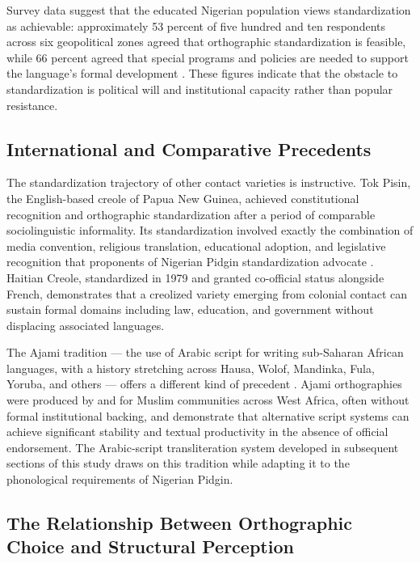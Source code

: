 \documentclass[12pt]{article}
\begin{document}
Survey data suggest that the educated Nigerian population views standardization as achievable: approximately 53 percent of five hundred and ten respondents across six geopolitical zones agreed that orthographic standardization is feasible, while 66 percent agreed that special programs and policies are needed to support the language's formal development \cite{AjaKilani2024}. These figures indicate that the obstacle to standardization is political will and institutional capacity rather than popular resistance.

\subsection{International and Comparative Precedents}

The standardization trajectory of other contact varieties is instructive. Tok Pisin, the English-based creole of Papua New Guinea, achieved constitutional recognition and orthographic standardization after a period of comparable sociolinguistic informality. Its standardization involved exactly the combination of media convention, religious translation, educational adoption, and legislative recognition that proponents of Nigerian Pidgin standardization advocate \cite{Holm1988}. Haitian Creole, standardized in 1979 and granted co-official status alongside French, demonstrates that a creolized variety emerging from colonial contact can sustain formal domains including law, education, and government without displacing associated languages.

The Ajami tradition --- the use of Arabic script for writing sub-Saharan African languages, with a history stretching across Hausa, Wolof, Mandinka, Fula, Yoruba, and others --- offers a different kind of precedent \cite{Ngom2010}. Ajami orthographies were produced by and for Muslim communities across West Africa, often without formal institutional backing, and demonstrate that alternative script systems can achieve significant stability and textual productivity in the absence of official endorsement. The Arabic-script transliteration system developed in subsequent sections of this study draws on this tradition while adapting it to the phonological requirements of Nigerian Pidgin.

\subsection{The Relationship Between Orthographic Choice and Structural Perception}
\end{document}
